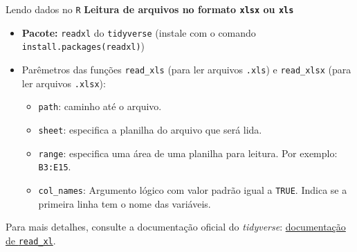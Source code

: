 \documentclass[
  10pt,
  ignorenonframetext,
]{beamer}
\providecommand{\tightlist}{%
  \setlength{\itemsep}{0pt}\setlength{\parskip}{0pt}}
\begin{document}
\begin{frame}[fragile]{Lendo dados no \texttt{R}}
\protect\hypertarget{lendo-dados-no-r}{}
\textbf{Leitura de arquivos no formato \texttt{xlsx} ou \texttt{xls}}

\begin{itemize}
\tightlist
\item
  \textbf{Pacote:} \texttt{readxl} do \texttt{tidyverse} (instale com o
  comando
  \texttt{install.packages(\textquotesingle{}readxl\textquotesingle{})})
\item
  Parêmetros das funções \texttt{read\_xls} (para ler arquivos
  \texttt{.xls}) e \texttt{read\_xlsx} (para ler arquivos
  \texttt{.xlsx}):

  \begin{itemize}
  \tightlist
  \item
    \texttt{path}: caminho até o arquivo.
  \item
    \texttt{sheet}: especifica a planilha do arquivo que será lida.
  \item
    \texttt{range}: especifica uma área de uma planilha para leitura.
    Por exemplo: \texttt{B3:E15}.
  \item
    \texttt{col\_names}: Argumento lógico com valor padrão igual a
    \texttt{TRUE}. Indica se a primeira linha tem o nome das variáveis.
  \end{itemize}
\end{itemize}

Para mais detalhes, consulte a documentação oficial do \emph{tidyverse}:
\href{https://readxl.tidyverse.org}{documentação de \texttt{read\_xl}}.
\end{frame}
\end{document}
